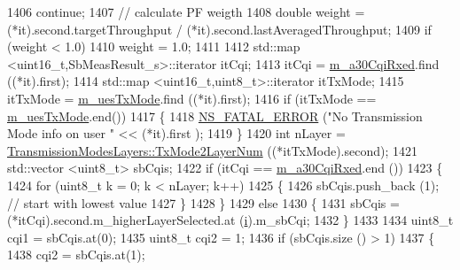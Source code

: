 \begin{DoxyCode}
1406                         \textcolor{keywordflow}{continue};
1407                       \textcolor{comment}{// calculate PF weigth }
1408                       \textcolor{keywordtype}{double} weight = (*it).second.targetThroughput / (*it).second.lastAveragedThroughput;
1409                       \textcolor{keywordflow}{if} (weight < 1.0)
1410                         weight = 1.0;
1411         
1412                       std::map <uint16\_t,SbMeasResult\_s>::iterator itCqi;
1413                       itCqi = \hyperlink{classns3_1_1PssFfMacScheduler_ab1bc511b7c55ead9b2e8ff1e0d4b0e3b}{m\_a30CqiRxed}.find ((*it).first);
1414                       std::map <uint16\_t,uint8\_t>::iterator itTxMode;
1415                       itTxMode = \hyperlink{classns3_1_1PssFfMacScheduler_a48aa1d9dc22e9c73e3c2206be76bb6cd}{m\_uesTxMode}.find ((*it).first);
1416                       \textcolor{keywordflow}{if} (itTxMode == \hyperlink{classns3_1_1PssFfMacScheduler_a48aa1d9dc22e9c73e3c2206be76bb6cd}{m\_uesTxMode}.end())
1417                         \{
1418                           \hyperlink{group__fatal_ga5131d5e3f75d7d4cbfd706ac456fdc85}{NS\_FATAL\_ERROR} (\textcolor{stringliteral}{"No Transmission Mode info on user "} << (*it).first
      );
1419                         \}
1420                       \textcolor{keywordtype}{int} nLayer = \hyperlink{classns3_1_1TransmissionModesLayers_a31f608b7bfaa77440fe4cb85ad035329}{TransmissionModesLayers::TxMode2LayerNum}
       ((*itTxMode).second);
1421                       std::vector <uint8\_t> sbCqis;
1422                       \textcolor{keywordflow}{if} (itCqi == \hyperlink{classns3_1_1PssFfMacScheduler_ab1bc511b7c55ead9b2e8ff1e0d4b0e3b}{m\_a30CqiRxed}.end ())
1423                         \{
1424                           \textcolor{keywordflow}{for} (uint8\_t k = 0; k < nLayer; k++)
1425                             \{
1426                               sbCqis.push\_back (1);  \textcolor{comment}{// start with lowest value}
1427                             \}
1428                         \}
1429                       \textcolor{keywordflow}{else}
1430                         \{
1431                           sbCqis = (*itCqi).second.m\_higherLayerSelected.at (\hyperlink{bernuolliDistribution_8m_a6f6ccfcf58b31cb6412107d9d5281426}{i}).m\_sbCqi;
1432                         \}
1433         
1434                       uint8\_t cqi1 = sbCqis.at(0);
1435                       uint8\_t cqi2 = 1;
1436                       \textcolor{keywordflow}{if} (sbCqis.size () > 1)
1437                         \{
1438                           cqi2 = sbCqis.at(1);

\end{DoxyCode}
